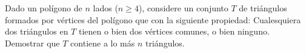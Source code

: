 Dado un polígono de $n$ lados ($n\ge 4$), considere un conjunto $T$ de triángulos formados por vértices del polígono que con la siguiente propiedad: Cualesquiera dos triángulos en $T$ tienen o bien dos vértices comunes, o bien ninguno. Demostrar que $T$ contiene a lo más $n$ triángulos.
